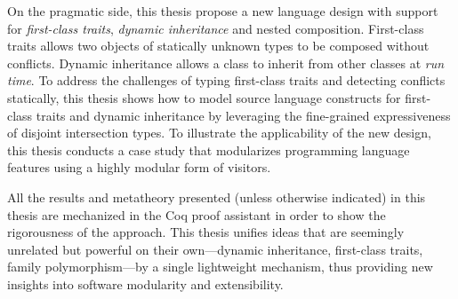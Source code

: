 On the pragmatic side, this thesis propose a new language design with support
for \textit{first-class traits}, \textit{dynamic inheritance} and nested
composition. First-class traits allows two objects of statically unknown types
to be composed without conflicts. Dynamic inheritance allows a class to inherit
from other classes at \textit{run time}. To address the challenges of typing
first-class traits and detecting conflicts statically, this thesis shows how to
model source language constructs for first-class traits and dynamic inheritance
by leveraging the fine-grained expressiveness of disjoint intersection types. To
illustrate the applicability of the new design, this thesis conducts a case
study that modularizes programming language features using a highly modular form
of visitors.

All the results and metatheory presented (unless otherwise indicated) in this
thesis are mechanized in the Coq proof assistant in order to show the
rigorousness of the approach. This thesis unifies ideas that are seemingly
unrelated but powerful on their own---dynamic inheritance, first-class traits,
family polymorphism---by a single lightweight mechanism, thus providing new
insights into software modularity and extensibility.
